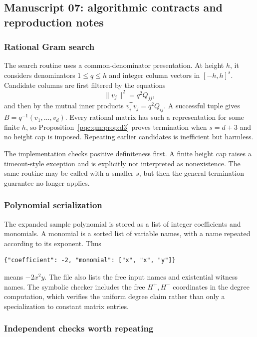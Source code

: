 \documentclass[11pt,letterpaper]{article}
\numberwithin{equation}{section}
\theoremstyle{definition}
\theoremstyle{remark}
\begin{document}
\subsection{Manuscript 07: algorithmic contracts and reproduction notes}
\label{pqc:qm:app:contracts}
\subsubsection{Rational Gram search}

The search routine uses a common-denominator presentation. At height $h$, it considers denominators $1\leq q\leq h$ and integer column vectors in $[-h,h]^s$. Candidate columns are first filtered by the equations
\[
 \lVert v_j\rVert^2=q^2Q_{jj},
\]
and then by the mutual inner products
$v_i^{\mathsf T}v_j=q^2Q_{ij}$. A successful tuple gives $B=q^{-1}(v_1,\ldots,v_d)$. Every rational matrix has such a representation for some finite $h$, so Proposition~\ref{pqc:qm:prop:d3} proves termination when $s=d+3$ and no height cap is imposed. Repeating earlier candidates is inefficient but harmless.

The implementation checks positive definiteness first. A finite height cap raises a timeout-style exception and is explicitly not interpreted as nonexistence. The same routine may be called with a smaller $s$, but then the general termination guarantee no longer applies.

\subsubsection{Polynomial serialization}

The expanded sample polynomial is stored as a list of integer coefficients and monomials. A monomial is a sorted list of variable names, with a name repeated according to its exponent. Thus
\begin{lstlisting}
{"coefficient": -2, "monomial": ["x", "x", "y"]}
\end{lstlisting}
means $-2x^2y$. The file also lists the free input names and existential witness names. The symbolic checker includes the free $H^+,H^-$ coordinates in the degree computation, which verifies the uniform degree claim rather than only a specialization to constant matrix entries.

\subsubsection{Independent checks worth repeating}
\end{document}
